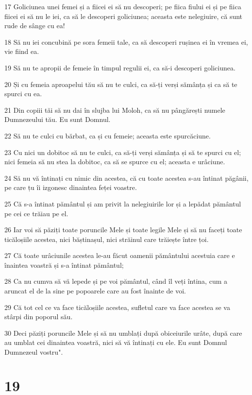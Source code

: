 \par 17 Goliciunea unei femei și a fiicei ei să nu descoperi; pe fiica fiului ei și pe fiica fiicei ei să nu le iei, ca să le descoperi goliciunea; aceasta este nelegiuire, că sunt rude de sânge cu ea!
\par 18 Să nu iei concubină pe sora femeii tale, ca să descoperi rușinea ei în vremea ei, vie fiind ea.
\par 19 Să nu te apropii de femeie în timpul regulii ei, ca să-i descoperi goliciunea.
\par 20 Și cu femeia aproapelui tău să nu te culci, ca să-ți verși sămânța și ca să te spurci cu ea.
\par 21 Din copiii tăi să nu dai în slujba lui Moloh, ca să nu pângărești numele Dumnezeului tău. Eu sunt Domnul.
\par 22 Să nu te culci cu bărbat, ca și cu femeie; aceasta este spurcăciune.
\par 23 Cu nici un dobitoc să nu te culci, ca să-ți verși sămânța și să te spurci cu el; nici femeia să nu stea la dobitoc, ca să se spurce cu el; aceasta e urâciune.
\par 24 Să nu vă întinați cu nimic din acestea, că cu toate acestea s-au întinat păgânii, pe care țu îi izgonesc dinaintea feței voastre.
\par 25 Că s-a întinat pământul și am privit la nelegiuirile lor și a lepădat pământul pe cei ce trăiau pe el.
\par 26 Iar voi să păziți toate poruncile Mele și toate legile Mele și să nu faceți toate ticăloșiile acestea, nici băștinașul, nici străinul care trăiește între țoi.
\par 27 Că toate urâciunile acestea le-au făcut oamenii pământului acestuia care e înaintea voastră și s-a întinat pământul;
\par 28 Ca nu cumva să vă lepede și pe voi pământul, când îl veți întina, cum a aruncat el de la sine pe popoarele care au fost înainte de voi.
\par 29 Că tot cel ce va face ticăloșiile acestea, sufletul care va face acestea se va stârpi din poporul său.
\par 30 Deci păziți poruncile Mele și să nu umblați după obiceiurile urâte, după care au umblat cei dinaintea voastră, nici să vă întinați cu ele. Eu sunt Domnul Dumnezeul vostru".

\chapter{19}

